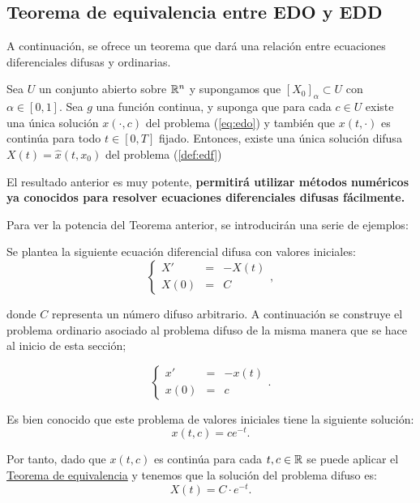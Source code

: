 \subsection{Teorema de equivalencia entre EDO y EDD}

A continuación, se ofrece un teorema que dará una relación entre ecuaciones diferenciales difusas y ordinarias.

\begin{teorema}
	\label{teorema:equivalencia}
	Sea $U$ un conjunto abierto sobre $\mathbb R^n$ y supongamos que $[X_0]_\alpha \subset U$ con $\alpha \in [0, 1]$. Sea $g$ una función continua, y suponga que para cada $c \in U$ existe una única solución $x(\cdot, c)$ del problema (\ref{eq:edo}) y también que $x(t, \cdot)$ es continúa para todo $t \in [0, T]$ fijado. Entonces, existe una única solución difusa $X(t) = \hat{x}(t, x_0)$ del problema (\ref{def:edf})
\end{teorema}
El resultado anterior es muy potente, \textbf{permitirá utilizar métodos numéricos ya conocidos para resolver ecuaciones diferenciales difusas fácilmente.}

Para ver la potencia del Teorema anterior, se introducirán una serie de ejemplos:

\begin{ejemplo}
	Se plantea la siguiente ecuación diferencial difusa con valores iniciales:
	\[
		\left\{
			\begin{array}{ccc}
				X' & = & - X(t) \\
				X(0) & =  & C
			\end{array}
		\right.,
	\]
	
	donde $C$ representa un número difuso arbitrario. A continuación se construye el problema ordinario asociado al problema difuso de la misma manera que se hace al inicio de esta sección;
	
	\[
		\left\{
			\begin{array}{ccc}
				x' & = & - x(t) \\
				x(0) & =  & c
			\end{array}
		\right..
	\]
	
	Es bien conocido que este problema de valores iniciales tiene la siguiente solución:
	\[
		x(t, c) = c e^{-t}.
	\]
	
	Por tanto, dado que $x(t, c)$ es continúa para cada $t, c \in \mathbb R$ se puede aplicar el \hyperref[teorema:equivalencia]{Teorema de equivalencia} y tenemos que la solución del problema difuso es:
	\[
		X(t) = C \cdot e^{-t}.
	\]
\end{ejemplo}

